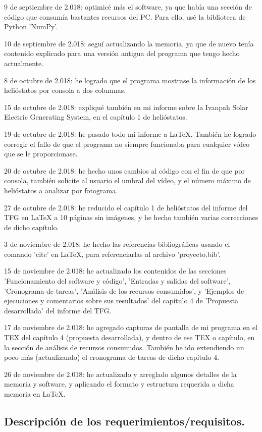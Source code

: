 9 de septiembre de 2.018: optimicé más el software, ya que había una sección de código que consumía bastantes recursos del PC. Para ello, usé la biblioteca de Python 'NumPy'.

10 de septiembre de 2.018: seguí actualizando la memoria, ya que de nuevo tenía contenido explicado para una versión antigua del programa que tengo hecho actualmente.

8 de octubre de 2.018: he logrado que el programa mostrase la información de los helióstatos por consola a dos columnas.

15 de octubre de 2.018: expliqué también en mi informe sobre la Ivanpah Solar Electric Generating System, en el capítulo 1 de helióstatos.

19 de octubre de 2.018: he pasado todo mi informe a LaTeX. También he logrado corregir el fallo de que el programa no siempre funcionaba para cualquier vídeo que se le proporcionase.

20 de octubre de 2.018: he hecho unos cambios al código con el fin de que por consola, también solicite al usuario el umbral del vídeo, y el número máximo de helióstatos a analizar por fotograma.

27 de octubre de 2.018: he reducido el capítulo 1 de helióstatos del informe del TFG en LaTeX a 10 páginas sin imágenes, y he hecho también varias correcciones de dicho capítulo.

3 de noviembre de 2.018: he hecho las referencias bibliográficas usando el comando 'cite' en LaTeX, para referenciarlas al archivo 'proyecto.bib'.

15 de noviembre de 2.018: he actualizado los contenidos de las secciones 'Funcionamiento del software y código', 'Entradas y salidas del software', 'Cronograma de tareas', 'Análisis de los recursos consumidos', y 'Ejemplos de ejecuciones y comentarios sobre sus resultados' del capítulo 4 de 'Propuesta desarrollada' del informe del TFG.

17 de noviembre de 2.018: he agregado capturas de pantalla de mi programa en el TEX del capítulo 4 (propuesta desarrollada), y dentro de ese TEX o capítulo, en la sección de análisis de recursos consumidos. También he ido extendiendo un poco más (actualizando) el cronograma de tareas de dicho capítulo 4.

26 de noviembre de 2.018: he actualizado y arreglado algunos detalles de la memoria y software, y aplicando el formato y estructura requerida a dicha memoria en LaTeX.

\subsection{Descripción de los requerimientos/requisitos.}

